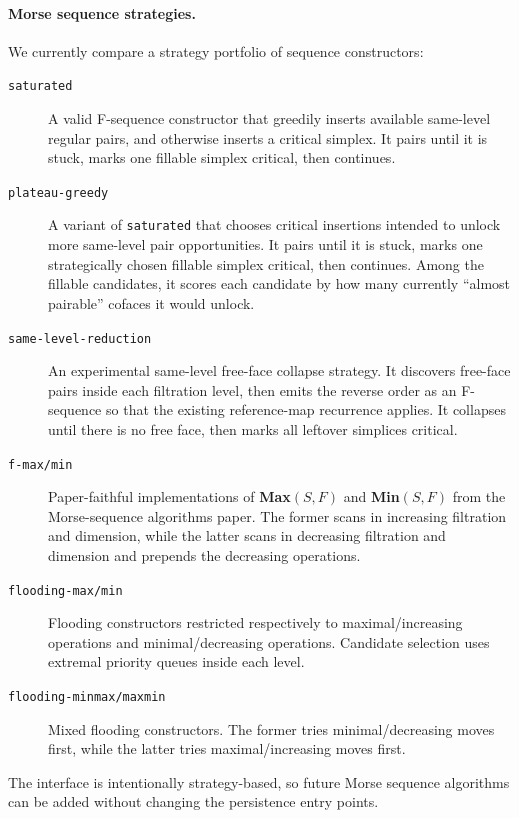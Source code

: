 \documentclass[11pt]{article}
\begin{document}
\paragraph{Morse sequence strategies.}
We currently compare a strategy portfolio of sequence constructors:
\begin{description}
  \item[\texttt{saturated}] A valid F-sequence constructor that greedily inserts available
        same-level regular pairs, and otherwise inserts a critical simplex.  It pairs until
        it is stuck, marks one fillable simplex critical, then continues.
  \item[\texttt{plateau-greedy}] A variant of \texttt{saturated} that chooses critical
        insertions intended to unlock more same-level pair opportunities.  It pairs until
        it is stuck, marks one strategically chosen fillable simplex critical, then
        continues.  Among the fillable candidates, it scores each candidate by how many
        currently ``almost pairable'' cofaces it would unlock.
  \item[\texttt{same-level-reduction}] An experimental same-level free-face collapse
        strategy.  It discovers free-face pairs inside each filtration level, then emits
        the reverse order as an F-sequence so that the existing reference-map recurrence
        applies.  It collapses until there is no free face, then marks all leftover
        simplices critical.
  \item[\texttt{f-max/min}] Paper-faithful implementations of \textbf{Max}$(S,F)$ and
        \textbf{Min}$(S,F)$ from the Morse-sequence algorithms paper.  The former scans in
        increasing filtration and dimension, while the latter scans in decreasing
        filtration and dimension and prepends the decreasing operations.
  \item[\texttt{flooding-max/min}] Flooding constructors restricted respectively to
        maximal/increasing operations and minimal/decreasing operations.  Candidate
        selection uses extremal priority queues inside each level.
  \item[\texttt{flooding-minmax/maxmin}] Mixed flooding constructors.  The former tries
        minimal/decreasing moves first, while the latter tries maximal/increasing moves
        first.
\end{description}
The interface is intentionally strategy-based, so future Morse sequence algorithms can be
added without changing the persistence entry points.
\end{document}
